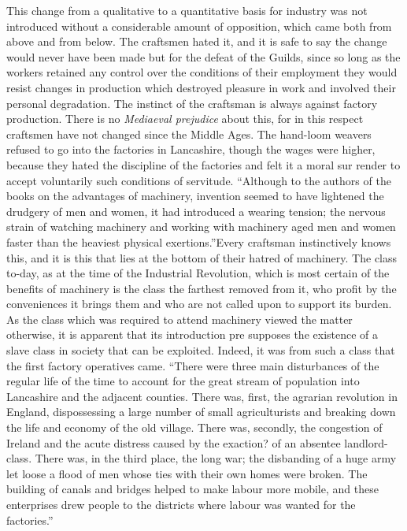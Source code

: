 \documentclass{book}
\begin{document}
This change from a qualitative to a quantitative basis for industry was not introduced without a considerable amount of opposition, which came both from above and from below. The craftsmen hated it, and it is safe to say the change would never have been made but for the defeat of the Guilds, since so long as the workers retained any control over the conditions of their employment they would resist changes in production which destroyed pleasure in work and involved their personal degradation. The instinct of the craftsman is always against factory production. There is no \emph{Mediaeval prejudice} about this, for in this respect craftsmen have not changed since the Middle Ages. The hand-loom weavers refused to go into the factories in Lancashire, though the wages were higher, because they hated the discipline of the factories and felt it a moral sur render to accept voluntarily such conditions of servitude. “Although to the authors of the books on the advantages of machinery, invention seemed to have lightened the drudgery of men and women, it had introduced a wearing tension; the nervous strain of watching machinery and working with machinery aged men and women faster than the heaviest physical exertions.”\footnotemark[1] Every craftsman instinctively knows this, and it is this that lies at the bottom of their hatred of machinery. The class to-day, as at the time of the Industrial Revolution, which is most certain of the benefits of machinery is the class the farthest removed from it, who profit by the conveniences it brings them and who are not called upon to support its burden. As the class which was required to attend machinery viewed the matter otherwise, it is apparent that its introduction pre supposes the existence of a slave class in society that can be exploited. Indeed, it was from such a class that the first factory operatives came. “There were three main disturbances of the regular life of the time to account for the great stream of population into Lancashire and the adjacent counties. There was, first, the agrarian revolution in England, dispossessing a large number of small agriculturists and breaking down the life and economy of the old village. There was, secondly, the congestion of Ireland and the acute distress caused by the exaction? of an absentee landlord-class. There was, in the third place, the long war; the disbanding of a huge army let loose a flood of men whose ties with their own homes were broken. The building of canals and bridges helped to make labour more mobile, and these enterprises drew people to the districts where labour was wanted for the factories.”\footnotemark[2]
\end{document}
